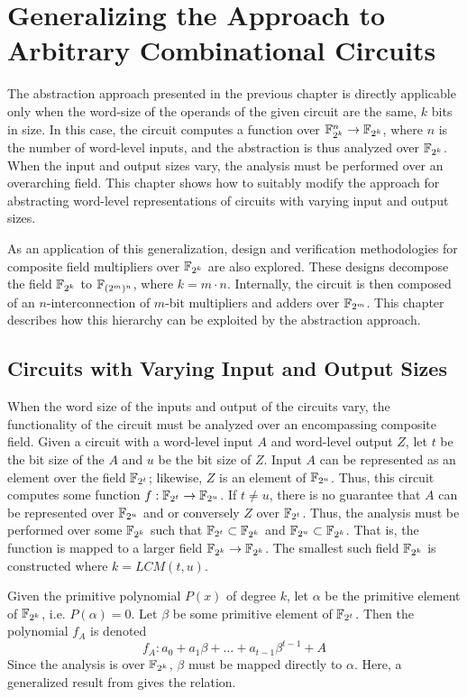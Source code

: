 \chapter{Generalizing the Approach to Arbitrary Combinational Circuits}\label{ch:generalize}
The abstraction approach presented in the previous chapter is
directly applicable only when the word-size of the operands 
of the given circuit are the same, $k$ bits in size. 
In this case, the circuit computes a function over ${\mathbb{F}}^n_{2^k} \rightarrow {\mathbb{F}}_{2^k}$, 
where $n$ is the number of word-level inputs,
and the abstraction is thus analyzed over ${\mathbb{F}}_{2^k}$. 
When the input and output sizes vary, the analysis must be performed 
over an overarching field.
This chapter shows how to suitably modify the approach for
abstracting word-level representations of circuits with varying input and output sizes.

As an application of this generalization, design and verification methodologies 
for composite field multipliers over ${\mathbb{F}}_{2^k}$ 
are also explored.
These designs decompose the field ${\mathbb{F}}_{2^k}$ to ${\mathbb{F}}_{(2^m)^n}$, where 
$k=m\cdot n$. 
Internally, the circuit is then composed of an $n$-interconnection of 
$m$-bit multipliers and adders over ${\mathbb{F}}_{2^m}$.
This chapter describes how this hierarchy can be exploited by the abstraction
approach.

\section{Circuits with Varying Input and Output Sizes}
When the word size of the inputs and output of the circuits vary, the 
functionality of the circuit must be analyzed over an encompassing composite field. 
Given a circuit with a word-level input $A$ and word-level output $Z$,
let $t$ be the bit size of the $A$ and $u$ be the bit size of $Z$.
Input $A$ can be represented as an element over the field ${\mathbb{F}}_{2^{t}}$; likewise,
$Z$ is an element of ${\mathbb{F}}_{2^u}$.
Thus, this circuit computes some function $f: {\mathbb{F}}_{2^t} \rightarrow {\mathbb{F}}_{2^u}$.
If $t \neq u$, there is no guarantee that $A$ can be represented over ${\mathbb{F}}_{2^u}$
and or conversely $Z$ over ${\mathbb{F}}_{2^t}$. Thus, the analysis must be performed over some 
${\mathbb{F}}_{2^k}$ such that ${\mathbb{F}}_{2^t} \subset {\mathbb{F}}_{2^k}$ and ${\mathbb{F}}_{2^u} \subset {\mathbb{F}}_{2^k}$. 
That is, the function is mapped to a larger field ${\mathbb{F}}_{2^k} \rightarrow {\mathbb{F}}_{2^k}$.
The smallest such field ${\mathbb{F}}_{2^k}$ is constructed where $k = LCM(t,u)$. 

Given the primitive polynomial $P(x)$ of degree $k$, let $\alpha$ be the primitive 
element of ${\mathbb{F}}_{2^k}$, i.e. $P(\alpha)=0$.
Let $\beta$ be some primitive
element of ${\mathbb{F}}_{2^t}$. Then the polynomial $f_A$ is denoted 
\begin{equation}
f_A: a_0+a_1\beta+\dots+a_{t-1}\beta^{t-1}+A 
\end{equation}
Since the analysis is over ${\mathbb{F}}_{2^k}$, $\beta$ must be mapped
directly to $\alpha$. Here, a generalized result from \cite{cf:2003} gives the relation.

